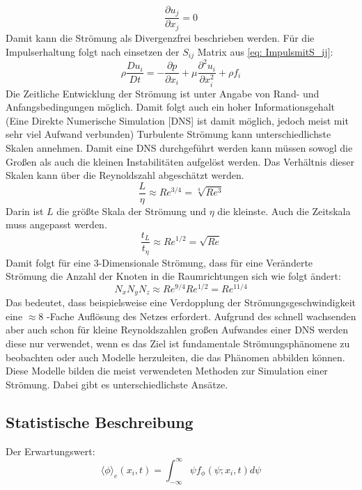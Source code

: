 \begin{equation}
	\frac{\partial u_{j}}{\partial x_{j}}=0
\end{equation}
Damit kann die Strömung als Divergenzfrei beschrieben werden. Für die Impulserhaltung folgt nach einsetzen der $S_{ij}$ Matrix aus \ref{eq: ImpulsmitS_ij}: 
\begin{equation}
	\rho \frac{Du_i}{Dt} = -\frac{\partial p}{\partial x_i}+\mu \frac{\partial^2 u_i}{\partial x^{2}_{i}} + \rho f_i
\end{equation}
Die Zeitliche Entwicklung der Strömung ist unter Angabe von Rand- und Anfangsbedingungen möglich. Damit folgt auch ein hoher Informationsgehalt (Eine Direkte Numerische Simulation [DNS] ist damit möglich, jedoch meist mit sehr viel Aufwand verbunden) 
Turbulente Strömung kann unterschiedlichste Skalen annehmen. Damit eine DNS durchgeführt werden kann müssen sowogl die Großen als auch die kleinen Instabilitäten aufgelöst werden. Das Verhältnis dieser Skalen kann über die Reynoldszahl abgeschätzt werden. 
\begin{equation}
	\frac{L}{\eta} \approx Re^{3/4} = \sqrt[4]{Re^3}
\end{equation}
Darin ist $L$ die größte Skala der Strömung und $\eta$ die kleinste. Auch die Zeitskala muss angepasst werden.
\begin{equation}
	\frac{t_L}{t_{\eta}} \approx Re^{1/2} = \sqrt{Re}
\end{equation}
Damit folgt für eine 3-Dimensionale Strömung, dass für eine Veränderte Strömung die Anzahl der Knoten in die Raumrichtungen sich wie folgt ändert:
\begin{equation}
	N_xN_yN_z \approx Re^{9/4}Re^{1/2} = Re^{11/4}
\end{equation}
Das bedeutet, dass beispielsweise eine Verdopplung der Strömungsgeschwindigkeit eine $\approx$8 -Fache Auflösung des Netzes erfordert. Aufgrund des schnell wachsenden aber auch schon für kleine Reynoldszahlen großen Aufwandes einer DNS werden diese nur verwendet, wenn es das Ziel ist fundamentale Strömungsphänomene zu beobachten oder auch Modelle herzuleiten, die das Phänomen abbilden können. Diese Modelle bilden die meist verwendeten Methoden zur Simulation einer Strömung. Dabei gibt es unterschiedlichste Ansätze. 


\subsection{Statistische Beschreibung}
Der Erwartungswert:
\begin{equation}
	\langle\phi\rangle_{e}\left(x_{i}, t\right)=\int_{-\infty}^{\infty} \psi f_{\phi}\left(\psi ; x_{i}, t\right) d \psi
\end{equation}